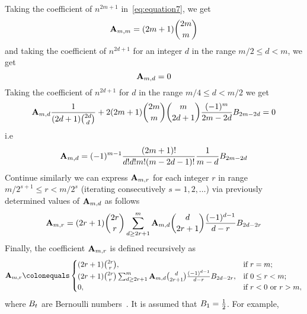 Taking the coefficient of $n^{2m+1}$ in~\eqref{eq:equation7}, we get
\begin{equation*}
    {\mathbf{A}} \sb{m,m} = (2m+1)\binom{2m}{m}
\end{equation*}
and taking the coefficient of $n^{2d+1}$ for an integer $d$ in the range $m/2 \leq d < m$, we get
\begin{equation*}
    {\mathbf{A}} \sb{m,d} = 0
\end{equation*}
Taking the coefficient of $n^{2d+1}$ for $d$ in the range $m/4 \leq d < m/2$ we get
\begin{equation*}
    {\mathbf{A}} \sb{m,d} \frac{1}{(2d+1) \binom{2d}{d}}
    +2 (2m+1) \binom{2m}{m}\binom{m}{2d+1} \frac{(-1)^m}{2m-2d} {B}\sb{2m-2d} = 0
\end{equation*}
i.e
\begin{equation*}
    {\mathbf{A}} \sb{m,d} = (-1)^{m-1} \frac{(2m+1)!}{d!d!m!(m-2d-1)!} \frac{1}{m-d} {B}\sb{2m-2d}
\end{equation*}
Continue similarly we can express ${\mathbf{A}} \sb{m,r}$ for each integer $r$ in range $m/2^{s+1}\leq r < m/2^s$
(iterating consecutively $s=1,2,\ldots$) via previously determined values of ${\mathbf{A}} \sb{m,d}$ as follows
\begin{equation*}
    {\mathbf{A}} \sb{m,r} =
    (2r+1) \binom{2r}{r} \sum_{d \geq 2r+1}^{m} {\mathbf{A}} \sb{m,d} \binom{d}{2r+1} \frac{(-1)^{d-1}}{d-r}
    {B}\sb{2d-2r}
\end{equation*}
Finally, the coefficient ${\mathbf{A}} \sb{m,r}$ is defined recursively as
\begin{equation}
    \label{eq:definition_coefficient_a}
    \coeffA{m}{r} \colonequals
    \begin{cases}
    (2r+1)
        \binom{2r}{r}, & \text{if } r=m; \\
        (2r+1) \binom{2r}{r} \sum_{d \geq 2r+1}^{m} \coeffA{m}{d} \binom{d}{2r+1} \frac{(-1)^{d-1}}{d-r}
        \bernoulli{2d-2r}, & \text{if } 0 \leq r<m; \\
        0, & \text{if } r<0 \text{ or } r>m,
    \end{cases}
\end{equation}
where ${B}\sb{t}$ are Bernoulli numbers~\cite{bateman1953higher}.
It is assumed that ${B}\sb{1}=\frac{1}{2}$.
For example,
